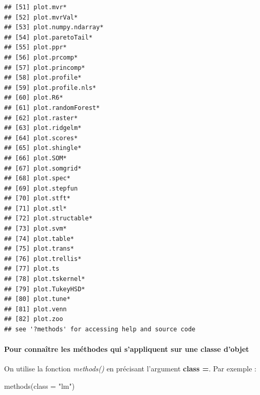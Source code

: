 \documentclass[
]{book}
\newenvironment{Shaded}{\begin{snugshade}}{\end{snugshade}}
\newcommand{\AttributeTok}[1]{\textcolor[rgb]{0.77,0.63,0.00}{#1}}
\newcommand{\FunctionTok}[1]{\textcolor[rgb]{0.00,0.00,0.00}{#1}}
\newcommand{\NormalTok}[1]{#1}
\newcommand{\StringTok}[1]{\textcolor[rgb]{0.31,0.60,0.02}{#1}}
\theoremstyle{definition}
\theoremstyle{definition}
\theoremstyle{definition}
\theoremstyle{definition}
\theoremstyle{remark}
\begin{document}
\begin{verbatim}
## [51] plot.mvr*                                 
## [52] plot.mvrVal*                              
## [53] plot.numpy.ndarray*                       
## [54] plot.paretoTail*                          
## [55] plot.ppr*                                 
## [56] plot.prcomp*                              
## [57] plot.princomp*                            
## [58] plot.profile*                             
## [59] plot.profile.nls*                         
## [60] plot.R6*                                  
## [61] plot.randomForest*                        
## [62] plot.raster*                              
## [63] plot.ridgelm*                             
## [64] plot.scores*                              
## [65] plot.shingle*                             
## [66] plot.SOM*                                 
## [67] plot.somgrid*                             
## [68] plot.spec*                                
## [69] plot.stepfun                              
## [70] plot.stft*                                
## [71] plot.stl*                                 
## [72] plot.structable*                          
## [73] plot.svm*                                 
## [74] plot.table*                               
## [75] plot.trans*                               
## [76] plot.trellis*                             
## [77] plot.ts                                   
## [78] plot.tskernel*                            
## [79] plot.TukeyHSD*                            
## [80] plot.tune*                                
## [81] plot.venn                                 
## [82] plot.zoo                                  
## see '?methods' for accessing help and source code
\end{verbatim}

\hypertarget{pour-connauxeetre-les-muxe9thodes-qui-sappliquent-sur-une-classe-dobjet}{%
\paragraph{Pour connaître les méthodes qui s'appliquent sur une classe d'objet}\label{pour-connauxeetre-les-muxe9thodes-qui-sappliquent-sur-une-classe-dobjet}}

On utilise la fonction \emph{methods()} en précisant l'argument \textbf{class =}. Par exemple :

\begin{Shaded}
\begin{Highlighting}[]
\FunctionTok{methods}\NormalTok{(}\AttributeTok{class =} \StringTok{"lm"}\NormalTok{)}
\end{Highlighting}
\end{Shaded}
\end{document}
